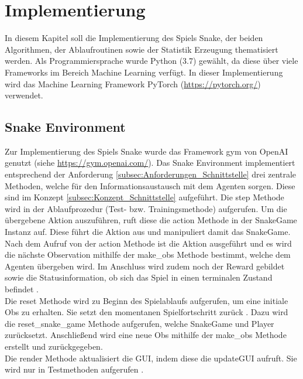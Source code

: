 \chapter{Implementierung} \label{chap:Implementierung}
In diesem Kapitel soll die Implementierung des Spiels Snake, der beiden Algorithmen, der Ablaufroutinen sowie der Statistik Erzeugung thematisiert werden. Als Programmiersprache wurde Python (3.7) gewählt, da diese über viele Frameworks im Bereich Machine Learning verfügt.
In dieser Implementierung wird das Machine Learning Framework PyTorch (\url{https://pytorch.org/}) verwendet.

\section{Snake Environment} \label{sec:Implementierung_Environment}
Zur Implementierung des Spiels Snake wurde das Framework gym von OpenAI genutzt (siehe \url{https://gym.openai.com/}). Das Snake Environment implementiert entsprechend der Anforderung \ref{subsec:Anforderungen_Schnittstelle} drei zentrale Methoden, welche für den Informationsaustausch mit dem Agenten sorgen. Diese sind im Konzept \ref{subsec:Konzept_Schnittstelle} aufgeführt. 
Die step Methode  wird in der Ablaufprozedur (Test- bzw. Trainingsmethode) aufgerufen. Um die übergebene Aktion auszuführen, ruft diese die action Methode in der SnakeGame Instanz auf. Diese führt die Aktion aus und manipuliert damit das SnakeGame.\\
Nach dem Aufruf von der action Methode ist die Aktion ausgeführt und es wird die nächste Observation mithilfe der make\_obs Methode bestimmt, welche dem Agenten übergeben wird. Im Anschluss wird zudem noch der Reward gebildet sowie die Statusinformation, ob sich das Spiel in einen terminalen Zustand befindet .\\
Die reset Methode  wird zu Beginn des Spielablaufs aufgerufen, um eine initiale Obs zu erhalten. Sie setzt den momentanen Spielfortschritt zurück . Dazu wird die reset\_snake\_game Methode aufgerufen, welche SnakeGame und Player zurücksetzt. Anschließend wird eine neue Obs mithilfe der make\_obs Methode erstellt und zurückgegeben.\\
Die render Methode  aktualisiert die GUI, indem diese die updateGUI aufruft. Sie wird nur in Testmethoden aufgerufen .
